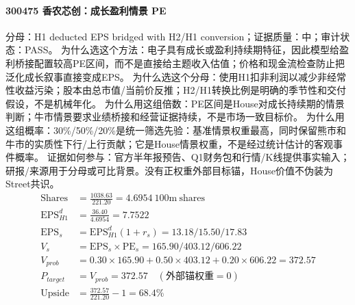 \paragraph{300475 香农芯创：成长盈利情景 PE}
分母：H1 deducted EPS bridged with H2/H1 conversion；证据质量：中；审计状态：PASS。
为什么选这个方法：电子具有成长或盈利持续期特征，因此模型给盈利桥接配置较高PE区间，而不是直接给主题收入估值；价格和现金流检查防止把泛化成长叙事直接变成EPS。
为什么选这个分母：使用H1扣非利润以减少非经常性收益污染；股本由总市值/当前价反推；H2/H1转换比例是明确的季节性和交付假设，不是机械年化。
为什么用这组倍数：PE区间是House对成长持续期的情景判断；牛市情景要求业绩桥接和经营证据持续，不是市场一致目标价。
为什么用这组概率：30\%/50\%/20\%是统一筛选先验：基准情景权重最高，同时保留熊市和牛市的实质性下行/上行贡献；它是House情景权重，不是经过统计估计的客观事件概率。
证据如何参与：官方半年报预告、Q1财务包和行情/K线提供事实输入；研报/来源用于分母或可比背景。没有正权重外部目标锚，House价值不伪装为Street共识。
\begin{align*}
\mathrm{Shares} &= \frac{1038.63}{221.20}=4.6954\ \mathrm{100m\ shares}\\
\mathrm{EPS}_{H1}^d &= \frac{36.40}{4.6954}=7.7522\\
\mathrm{EPS}_s &= \mathrm{EPS}_{H1}^d(1+r_s)=13.18/15.50/17.83\\
V_s &= \mathrm{EPS}_s\times \mathrm{PE}_s=165.90/403.12/606.22\\
V_{prob} &= 0.30\times 165.90+0.50\times 403.12+0.20\times 606.22=372.57\\
P_{target} &= V_{prob}=372.57\quad(\text{外部锚权重}=0)\\
\mathrm{Upside} &= \frac{372.57}{221.20}-1=68.4\%\\
\end{align*}


